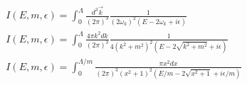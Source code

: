 \begin{align}
    I(E,m,\epsilon) = \int^\Lambda_0 \frac{d^3\vec{k}}{(2\pi)^3} \frac{1}{(2\omega_k)^2(E-2\omega_k+i\epsilon)}\\
    I(E,m,\epsilon) = \int^\Lambda_0 \frac{4 \pi k^2 dk}{(2\pi)^3} \frac{1}{4(k^2+m^2)^2(E-2\sqrt{k^2+m^2}+i\epsilon)}\\
    I(E,m,\epsilon) = \int^{\Lambda/m}_0 \frac{\pi x^2 dx}{(2\pi)^3(x^2+1)^2(E/m-2\sqrt{x^2+1}+i\epsilon/m)}\\
\end{align}
